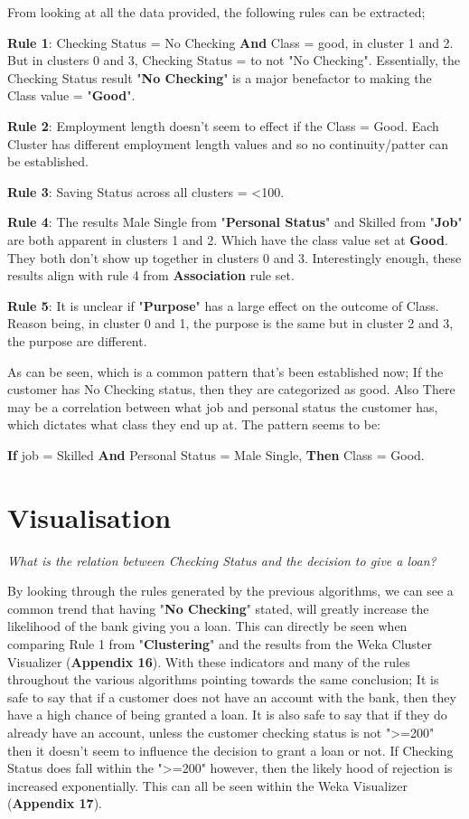 \documentclass[12pt, a4paper]{article}
\begin{document}
    From looking at all the data provided, the following rules can be extracted;
    
    \textbf{Rule 1}: Checking Status = No Checking \textbf{And} Class = good, in cluster 1 and 2. But in clusters 0 and 3, Checking Status = to not "No Checking". Essentially, the Checking Status result "\textbf{No Checking}" is a major benefactor to making the Class value = "\textbf{Good}".
    
    \textbf{Rule 2}: Employment length doesn't seem to effect if the Class = Good. Each Cluster has different employment length values and so no continuity/patter can be established.
    
    \textbf{Rule 3}: Saving Status across all clusters = <100.
    
    \textbf{Rule 4}: The results Male Single from "\textbf{Personal Status}" and Skilled from "\textbf{Job}" are both apparent in clusters 1 and 2. Which have the class value set at \textbf{Good}. They both don't show up together in clusters 0 and 3. Interestingly enough, these results align with rule 4 from \textbf{Association} rule set.
    
    \textbf{Rule 5}: It is unclear if "\textbf{Purpose}" has a large effect on the outcome of Class. Reason being, in cluster 0 and 1, the purpose is the same but in cluster 2 and 3, the purpose are different.
    
    As can be seen, which is a common pattern that's been established now; If the customer has No Checking status, then they are categorized as good. Also There may be a correlation between what job and personal status the customer has, which dictates what class they end up at. The pattern seems to be: 
    
    \textbf{If} job = Skilled \textbf{And} Personal Status = Male Single, \textbf{Then} Class = Good.
    
    \section{Visualisation}
    \textit{What is the relation between Checking Status and the decision to give a loan?}
    
    By looking through the rules generated by the previous algorithms, we can see a common trend that having "\textbf{No Checking}" stated, will greatly increase the likelihood of the bank giving you a loan. This can directly be seen when comparing Rule 1 from "\textbf{Clustering}" and the results from the Weka Cluster Visualizer (\textbf{Appendix 16}). With these indicators and many of the rules throughout the various algorithms pointing towards the same conclusion; It is safe to say that if a customer does not have an account with the bank, then they have a high chance of being granted a loan. It is also safe to say that if they do already have an account, unless the customer checking status is not ">=200" then it doesn't seem to influence the decision to grant a loan or not. If Checking Status does fall within the ">=200" however, then the likely hood of rejection is increased exponentially. This can all be seen within the Weka Visualizer (\textbf{Appendix 17}).
    
\end{document}
